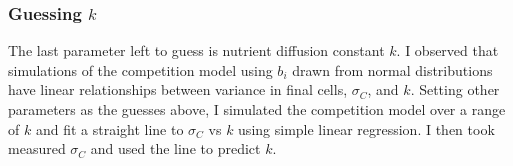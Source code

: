 
\subsubsection{\boldmath Guessing \(k\) \unboldmath}

The last parameter left to guess is nutrient diffusion constant
\(k\). I observed that simulations of the competition model using
\(b_{i}\) drawn from normal distributions have linear relationships
between variance in final cells, \(\sigma_{C}\), and \(k\). Setting
other parameters as the guesses above, I simulated the competition
model
over a range of \(k\) and fit a straight line to \(\sigma_{C}\) vs
\(k\) using simple linear regression. I then took measured
\(\sigma_{C}\) and used the line to predict \(k\).




%


